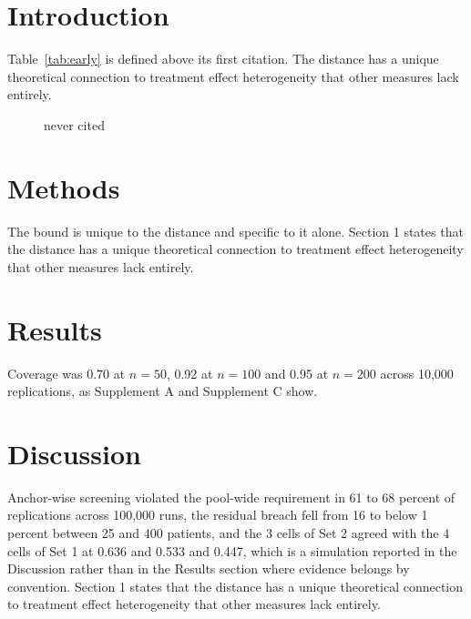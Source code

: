 \documentclass{article}
\begin{document}
\section{Introduction}\label{sec:intro}
\begin{table}\caption{defined before cited\label{tab:early}}\end{table}
Table~\ref{tab:early} is defined above its first citation. The distance has a unique theoretical connection to treatment effect heterogeneity that other measures lack entirely.
\begin{figure}\caption{never cited\label{fig:orphan}}\end{figure}
\section{Methods}\label{sec:methods}
The bound is unique to the distance and specific to it alone. Section 1 states that the distance has a unique theoretical connection to treatment effect heterogeneity that other measures lack entirely.
\section{Results}\label{sec:results}
Coverage was 0.70 at $n=50$, 0.92 at $n=100$ and 0.95 at $n=200$ across 10,000 replications, as Supplement A and Supplement C show.
\section{Discussion}\label{sec:discussion}
Anchor-wise screening violated the pool-wide requirement in 61 to 68 percent of replications across 100,000 runs, the residual breach fell from 16 to below 1 percent between 25 and 400 patients, and the 3 cells of Set 2 agreed with the 4 cells of Set 1 at 0.636 and 0.533 and 0.447, which is a simulation reported in the Discussion rather than in the Results section where evidence belongs by convention. Section 1 states that the distance has a unique theoretical connection to treatment effect heterogeneity that other measures lack entirely.
\end{document}
